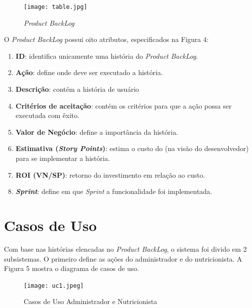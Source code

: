 \begin{figure} [hbt] 
\begin{center}
\texttt{[image: table.jpg]}
\end{center}
\label{table1} 
\caption{\textit{Product BackLog}}
\end{figure}

O \textit{Product BackLog} possui oito atributos, especificados na Figura 4: %

\begin{enumerate}

\item \textbf{ID}: identifica unicamente uma história do \textit{Product BackLog}.
\item \textbf{Ação}: define onde deve ser executado a história.
\item \textbf{Descrição}: contém a história de usuário
\item \textbf{Critérios de aceitação}: contém os critérios para que a ação possa ser
executada com êxito.
\item \textbf{Valor de Negócio}: define a importância da história.
\item \textbf{Estimativa (\textit{Story Points})}: estima o custo do (na visão do desenvolvedor)
para se implementar a história.
\item \textbf{ROI (VN/SP)}: retorno do investimento em relação ao custo.
\item \textbf{\textit{Sprint}}: define em que \textit{Sprint} a funcionalidade foi implementada.

\end{enumerate}

\section{Casos de Uso}

Com base nas histórias elencadas no \textit{Product BackLog}, o sistema foi divido em 2
subsistemas. O primeiro define as ações do administrador e do nutricionista. A Figura 5
mostra o diagrama de casos de uso.

\begin{figure} [hbt] 
\begin{center}
\texttt{[image: uc1.jpeg]}
\end{center}
\label{uc1} 
\caption{Casos de Uso Administrador e Nutricionista}
\end{figure}

